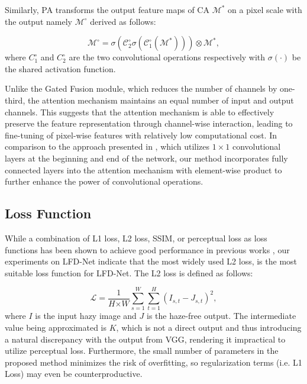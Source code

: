 \documentclass[lettersize,journal]{IEEEtran}
\begin{document}
Similarly, PA transforms the output feature maps of CA $\mathcal{M}^*$ on a pixel scale with the output namely $\mathcal{M}^{\circ}$ derived as follows:

\begin{equation}
    \mathcal{M}^{\circ} = \sigma(\mathcal{C}_2^{\circ} \sigma (\mathcal{C}_1^{\circ}(\mathcal{M}^*))) \otimes \mathcal{M}^*, 
\end{equation}
where $C_1^{\circ}$ and $C_2^{\circ}$ are the two convolutional operations respectively with $\sigma(\cdot)$ be the shared activation function. 

Unlike the Gated Fusion module, which reduces the number of channels by one-third, the attention mechanism maintains an equal number of input and output channels. This suggests that the attention mechanism is able to effectively preserve the feature representation through channel-wise interaction, leading to fine-tuning of pixel-wise features with relatively low computational cost. In comparison to the approach presented in \cite{ullah2021light}, which utilizes $1 \times 1$ convolutional layers at the beginning and end of the network, our method incorporates fully connected layers into the attention mechanism with element-wise product to further enhance the power of convolutional operations.

\subsection{Loss Function}
While a combination of L1 loss, L2 loss, SSIM, or perceptual loss as loss functions has been shown to achieve good performance in previous works \cite{zhao2016loss, lim2017enhanced, rad2019srobb, guo2020joint}, our experiments on LFD-Net indicate that the most widely used L2 loss, is the most suitable loss function for LFD-Net. The L2 loss is defined as follows:

\begin{equation}
    \mathcal{L} = \frac{1}{\textit{H} \times \textit{W}} \sum_{s=1}^\textit{W} \sum_{t=1}^{\textit{H}} (I_{s,t} - J_{s,t})^2,
\end{equation}
where $I$ is the input hazy image and $J$ is the haze-free output. The intermediate value being approximated is $K$, which is not a direct output and thus introducing a natural discrepancy with the output from VGG, rendering it impractical to utilize perceptual loss. Furthermore, the small number of parameters in the proposed method minimizes the risk of overfitting, so regularization terms (i.e. L1 Loss) may even be counterproductive.
\end{document}
